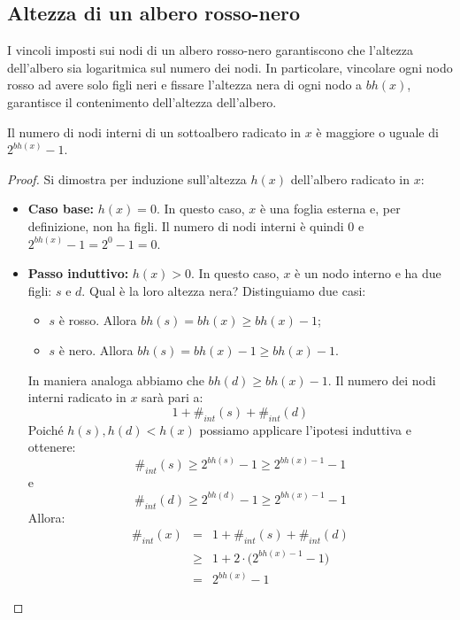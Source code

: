 \subsection{Altezza di un albero rosso-nero}
I vincoli imposti sui nodi di un albero rosso-nero garantiscono che l'altezza dell'albero sia logaritmica sul numero dei nodi. In particolare, vincolare ogni nodo rosso ad avere solo figli neri e fissare l'altezza nera di ogni nodo a $bh(x)$, garantisce il contenimento dell'altezza dell'albero.


\begin{lemmabox}
Il numero di nodi interni di un sottoalbero radicato in $x$ è maggiore o uguale di $2^{bh(x)}-1$.
\end{lemmabox}
\begin{proof}
Si dimostra per induzione sull'altezza $h(x)$ dell'albero radicato in $x$:

\begin{itemize}
\item \textbf{Caso base:} $h(x)=0$. In questo caso, $x$ è una foglia esterna e, per definizione, non ha figli. Il numero di nodi interni è quindi $0$ e $2^{bh(x)}-1=2^0-1=0$.

\item \textbf{Passo induttivo:} $h(x)>0$. In questo caso, $x$ è un nodo interno e ha due figli: $s$ e $d$. Qual è la loro altezza nera? Distinguiamo due casi:
\begin{itemize}
\item $s$ è rosso. Allora $bh(s)=bh(x)\geq bh(x)-1$;
\item $s$ è nero. Allora $bh(s)=bh(x)-1\geq bh(x)-1$.
\end{itemize}
In maniera analoga abbiamo che $bh(d)\geq bh(x)-1$. Il numero dei nodi interni radicato in $x$ sarà pari a:
\begin{displaymath}
1 + \#_{int}(s) + \#_{int}(d)
\end{displaymath}
Poiché $h(s),h(d)<h(x)$ possiamo applicare l'ipotesi induttiva e ottenere:
\begin{displaymath}
\#_{int}(s)\geq 2^{bh(s)}-1 \geq 2^{bh(x)-1}-1
\end{displaymath}
e
\begin{displaymath}
\#_{int}(d)\geq 2^{bh(d)}-1 \geq 2^{bh(x)-1}-1
\end{displaymath}
Allora:
\begin{eqnarray*}
\#_{int}(x) &=& 1 + \#_{int}(s) + \#_{int}(d) \\
&\geq& 1 + 2 \cdot \bigl( 2^{bh(x)-1}-1\bigr) \\
&=& 2^{bh(x)}-1
\end{eqnarray*}
\end{itemize}
\end{proof}



